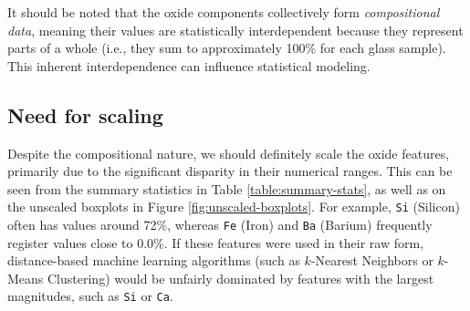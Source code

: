 \documentclass[dtu]{dtuarticle}
\begin{document}
	It should be noted that the oxide components collectively form \textit{compositional data}, meaning their values are statistically interdependent because they represent parts of a whole (i.e., they sum to approximately 100\% for each glass sample). This inherent interdependence can influence statistical modeling.

	\subsection{Need for scaling}

	\label{section:scaling}

	Despite the compositional nature, we should definitely scale the oxide features, primarily due to the significant disparity in their numerical ranges. This can be seen from the summary statistics in Table \ref{table:summary-stats}, as well as on the unscaled boxplots in Figure \ref{fig:unscaled-boxplots}. For example, \texttt{Si} (Silicon) often has values around 72\%, whereas \texttt{Fe} (Iron) and \texttt{Ba} (Barium) frequently register values close to 0.0\%. If these features were used in their raw form, distance-based machine learning algorithms (such as $k$-Nearest Neighbors or $k$-Means Clustering) would be unfairly dominated by features with the largest magnitudes, such as \texttt{Si} or \texttt{Ca}.
\end{document}
